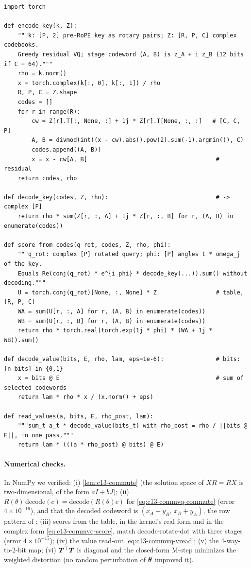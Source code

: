 \begin{lstlisting}[caption={Reference implementation (ours): additive VQ of a KV vector with a RoPE-commuting key codebook},label={lst:c13-commvq-ref}]
import torch

def encode_key(k, Z):
    """k: [P, 2] pre-RoPE key as rotary pairs; Z: [R, P, C] complex codebooks.
    Greedy residual VQ; stage codeword (A, B) is z_A + i z_B (12 bits if C = 64)."""
    rho = k.norm()
    x = torch.complex(k[:, 0], k[:, 1]) / rho
    R, P, C = Z.shape
    codes = []
    for r in range(R):
        cw = Z[r].T[:, None, :] + 1j * Z[r].T[None, :, :]   # [C, C, P]
        A, B = divmod(int((x - cw).abs().pow(2).sum(-1).argmin()), C)
        codes.append((A, B))
        x = x - cw[A, B]                                     # residual
    return codes, rho

def decode_key(codes, Z, rho):                               # -> complex [P]
    return rho * sum(Z[r, :, A] + 1j * Z[r, :, B] for r, (A, B) in enumerate(codes))

def score_from_codes(q_rot, codes, Z, rho, phi):
    """q_rot: complex [P] rotated query; phi: [P] angles t * omega_j of the key.
    Equals Re(conj(q_rot) * e^{i phi} * decode_key(...)).sum() without decoding."""
    U = torch.conj(q_rot)[None, :, None] * Z                 # table, [R, P, C]
    WA = sum(U[r, :, A] for r, (A, B) in enumerate(codes))
    WB = sum(U[r, :, B] for r, (A, B) in enumerate(codes))
    return rho * torch.real(torch.exp(1j * phi) * (WA + 1j * WB)).sum()

def decode_value(bits, E, rho, lam, eps=1e-6):               # bits: [n_bits] in {0,1}
    x = bits @ E                                             # sum of selected codewords
    return lam * rho * x / (x.norm() + eps)

def read_values(a, bits, E, rho_post, lam):
    """sum_t a_t * decode_value(bits_t) with rho_post = rho / ||bits @ E||, in one pass."""
    return lam * (((a * rho_post) @ bits) @ E)
\end{lstlisting}

\paragraph{Numerical checks.} In NumPy we verified: (i) \cref{lem:c13-commute} (the solution space of
$XR=RX$ is two-dimensional, of the form $aI+bJ$); (ii) $R(\theta)\,\mathrm{decode}(c)=\mathrm{decode}(R(\theta)c)$
for \eqref{eq:c13-commvq-commute} (error $4\times10^{-16}$), and that the decoded codeword is
$(x_A-y_B,\,x_B+y_A)$, the row pattern of ; (iii) scores from the table, in the kernel's real form
and in the complex form \eqref{eq:c13-commvq-score}, match decode-rotate-dot with three stages (error
$4\times10^{-15}$); (iv) the value read-out \eqref{eq:c13-commvq-vread}; (v) the 4-way-to-2-bit map;
(vi) $\bm{T}^{\top}\bm{T}$ is diagonal and the closed-form M-step minimizes the weighted distortion (no random
perturbation of $\bm{\theta}$ improved it).

